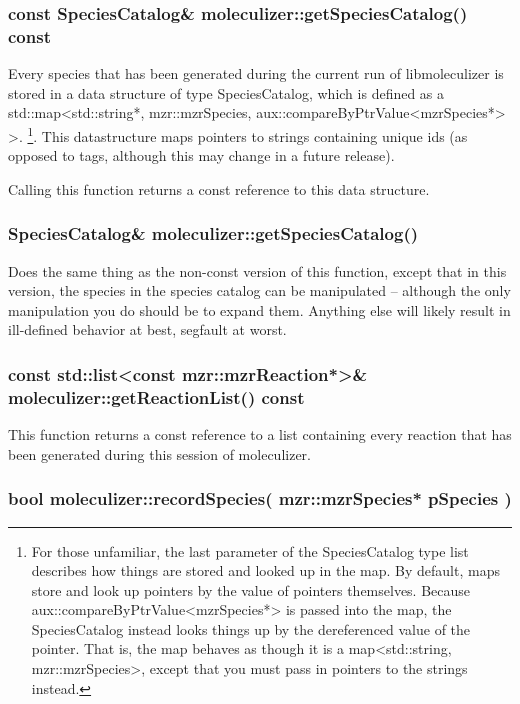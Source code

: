 \subsubsection{const SpeciesCatalog\& moleculizer::getSpeciesCatalog()
  const }
Every species that has been generated during the current run of
libmoleculizer is stored in a data structure of type SpeciesCatalog,
which is defined as a std::map<std::string*, mzr::mzrSpecies,
aux::compareByPtrValue<mzrSpecies*> >.  \footnote{For those unfamiliar, the
last parameter of the SpeciesCatalog type list describes how things
are stored and looked up in the map.  By default, maps store and look
up pointers by the value of pointers themselves.  Because
aux::compareByPtrValue<mzrSpecies*> is passed into the map, the
SpeciesCatalog instead looks things up by the dereferenced value of
the pointer.  That is, the map behaves as though it is a
map<std::string, mzr::mzrSpecies>, except that you must pass in
pointers to the strings instead.}.  This datastructure maps pointers
to strings containing unique ids (as opposed to tags, although this
may change in a future release).  

Calling this function returns a const reference to this
data structure.  

\subsubsection{SpeciesCatalog\& moleculizer::getSpeciesCatalog() }

Does the same thing as the non-const version of this function, except
that in this version, the species in the species catalog can be
manipulated -- although the only manipulation you do should be to
expand them.  Anything else will likely result in ill-defined behavior
at best, segfault at worst.  

\subsubsection{const std::list<const mzr::mzrReaction*>\& moleculizer::getReactionList()
  const}

This function returns a const reference to a list containing every
reaction that has been generated during this session of moleculizer.  

\subsubsection{bool moleculizer::recordSpecies( mzr::mzrSpecies*
  pSpecies ) }

